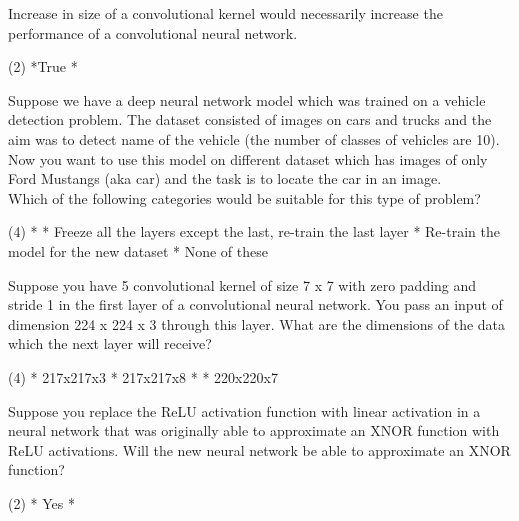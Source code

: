 \documentclass[10pt]{extarticle}
\begin{document}
\begin{exercise}
    Increase in size of a convolutional kernel would necessarily increase the performance of a convolutional neural network. 
    \begin{choice} (2)
        *True
        * 
    \end{choice}
\end{exercise}
\begin{solution}
\end{solution}

\begin{exercise}
    Suppose we have a deep neural network model which was trained on a vehicle detection problem. The dataset consisted of images on cars and trucks and the aim was to detect name of the vehicle (the number of classes of vehicles are 10).
    Now you want to use this model on different dataset which has images of only Ford Mustangs (aka car) and the task is to locate the car in an image.\\

    Which of the following categories would be suitable for this type of problem?
    \begin{choice} (4)
        * 
        * Freeze all the layers except the last, re-train the last layer
        * Re-train the model for the new dataset
        * None of these
    \end{choice}
\end{exercise}
\begin{solution}
\end{solution}

\begin{exercise}
    Suppose you have 5 convolutional kernel of size 7 x 7 with zero padding and stride 1 in the first layer of a convolutional neural network. You pass an input of dimension 224 x 224 x 3 through this layer. What are the dimensions of the data which the next layer will receive? 
    \begin{choice} (4)
        * 217x217x3
        * 217x217x8
        *
        * 220x220x7
    \end{choice}
\end{exercise}
\begin{solution}
\end{solution}

\begin{exercise}
    Suppose you replace the ReLU activation function with linear activation in a neural network that was originally able to approximate an XNOR function with ReLU activations. Will the new neural network be able to approximate an XNOR function?
    \begin{choice} (2)
        * Yes
        *
    \end{choice}
\end{exercise}
\begin{solution}
\end{solution}
\end{document}
